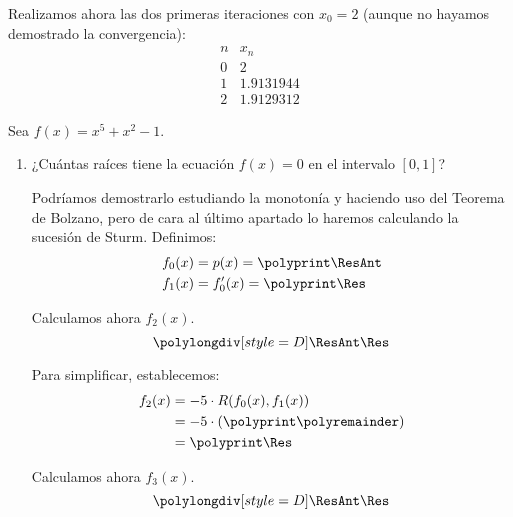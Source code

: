 \begin{ejercicio}
    Realizamos ahora las dos primeras iteraciones con $x_0=2$ (aunque no hayamos demostrado la convergencia):
    \begin{equation*}
        \begin{array}{c|c}
            n & x_n\\ \hline
            0 & 2\\
            1 & 1.9131944\\
            2 & 1.9129312
        \end{array}
    \end{equation*}
\end{ejercicio}

\begin{ejercicio}\label{ej:1.1.11}
    Sea $f(x) = x^5 + x^2 - 1$.
    \begin{enumerate}
        \item ¿Cuántas raíces tiene la ecuación $f(x) = 0$ en el intervalo $[0, 1]$?
        
        Podríamos demostrarlo estudiando la monotonía y haciendo uso del Teorema de Bolzano, pero de cara al último apartado lo haremos calculando la sucesión de Sturm.
        Definimos:
        \polymul{}
        \polymul{}
        \begin{align*}
            f_0(x) &= p(x) = \polyprint\ResAnt\\
            f_1(x) &= f_0'(x) = \polyprint\Res
        \end{align*}

        Calculamos ahora $f_2(x)$.
        \begin{equation*}
            \polylongdiv[style=D]\ResAnt\Res
        \end{equation*}
        \polydiv\div\ResAnt\Res
        \polymul\ResAnt{}
        \polymul\Res{}

        Para simplificar, establecemos:
        \begin{align*}
            f_2(x) &= -5\cdot R(f_0(x), f_1(x))\\
            &= -5\cdot \left(\polyprint\polyremainder\right)\\
            &= \polyprint\Res
        \end{align*}

        Calculamos ahora $f_3(x)$.
        \begin{equation*}
            \polylongdiv[style=D]\ResAnt\Res
        \end{equation*}
        \polydiv\div\ResAnt\Res
        \polymul\ResAnt{}
        \polymul\Res{}


\end{enumerate}
\end{ejercicio}
